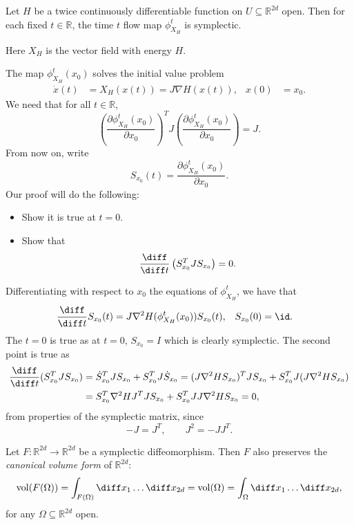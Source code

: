 \documentclass[12pt]{article}
\begin{document}
\begin{proposition}
	Let $H$ be a twice continuously differentiable function on $U \subseteq \mathbb{R}^{2d}$ open. Then for each fixed $t \in \mathbb{R}$, the time $t$ flow map $\phi_{X_H}^{t}$ is symplectic.
\end{proposition}

Here $X_H$ is the vector field with energy $H$.

\begin{proofbox}
	The map $\phi_{X_H}^{t}(x_0)$ solves the initial value problem
	\begin{align*}
		\dot x(t) &= X_H(x(t)) = J \nabla H(x(t)), & x(0) &= x_0.
	\end{align*}
	We need that for all $t \in \mathbb{R}$,
	\[
	\left( \frac{\partial \phi_{X_H}^{t}(x_0)}{\partial x_0}\right)^{T} J \left( \frac{\partial \phi_{X_H}^{t}(x_0)}{\partial x_0} \right) = J.
	\]
	From now on, write
	\[
	S_{x_0}(t) = \frac{\partial \phi_{X_H}^{t}(x_0)}{\partial x_0}.
	\]
	Our proof will do the following:
	\begin{itemize}
		\item Show it is true at $t = 0$.
		\item Show that
			\[
			\frac{\diff}{\diff t} \left( S_{x_0}^{T} J S_{x_0} \right) = 0.
			\]
	\end{itemize}
	Differentiating with respect to $x_0$ the equations of $\phi_{X_H}^{t}$, we have that
	\begin{align*}
		\frac{\diff}{\diff t} S_{x_0}(t) &= J \nabla^2 H(\phi_{X_H}^{t}(x_0)) S_{x_0}(t), & S_{x_0}(0) &= \id.
	\end{align*}
	The $t = 0$ is true as at $t = 0$, $S_{x_0} = I$ which is clearly symplectic. The second point is true as
	\begin{align*}
		\frac{\diff}{\diff t}(S_{x_0}^{T} J S_{x_0}) &= \dot S_{x_0}^{T} J S_{x_0} + S_{x_0}^{T} J \dot S_{x_0} = (J \nabla^2 H S_{x_0})^{T} J S_{x_0} + S_{x_0}^{T} J (J\nabla^2 H S_{x_0}) \\
							     &= S_{x_0}^{T} \nabla^2 H J^{T} J S_{x_0} + S_{x_0}^{T} J J \nabla^2 H S_{x_0} = 0,
	\end{align*}
	from properties of the symplectic matrix, since
	\[
	-J = J^{T}, \qquad J^2 = -J J^{T}.
	\]
\end{proofbox}


\begin{lemma}
	Let $F : \mathbb{R}^{2d} \to \mathbb{R}^{2d}$ be a symplectic diffeomorphism. Then $F$ also preserves the \emph{canonical volume form} of $\mathbb{R}^{2d}$:
	\[
	\mathrm{vol}(F(\Omega)) = \int_{F(\Omega)} \diff x_1 \ldots \diff x_{2d} = \mathrm{vol}(\Omega) = \int_{\Omega} \diff x_1 \ldots \diff x_{2d},
	\]
	for any $\Omega \subseteq \mathbb{R}^{2d}$ open.
\end{lemma}
\end{document}

